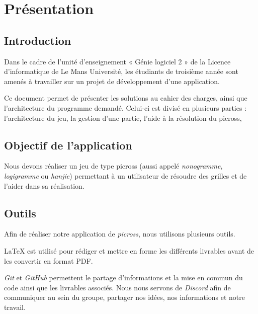 \documentclass{report}
\begin{document}
\renewcommand{\contentsname}{Sommaire}
\tableofcontents
\thispagestyle{empty}
\thispagestyle{plain}

\chapter{Présentation}
\thispagestyle{empty}
\thispagestyle{plain}

	\section{Introduction}

		Dans le cadre de l'unité d'enseignement « Génie logiciel 2 » de la Licence d'informatique de Le Mans Université, les étudiants de troisième année sont amenés à travailler sur un projet de développement d'une application.
		
		Ce document permet de présenter les solutions au cahier des charges, ainsi que l'architecture du programme demandé. Celui-ci est divisé en plusieurs parties : l'architecture du jeu, la gestion d'une partie, l'aide à la résolution du picross, %

	
 	\section{Objectif de l'application}		
		Nous devons réaliser un jeu de type picross (aussi appelé \textit{nonogramme}, \textit{logigramme} ou \textit{hanjie}) permettant à un utilisateur de résoudre des grilles et de l'aider dans sa réalisation.
		
	\section{Outils}
		
		Afin de réaliser notre application de \textit{picross}, nous utilisons plusieurs outils.
		
	LaTeX est utilisé pour rédiger et mettre en forme les différents livrables avant de les convertir en format PDF. 
	
    \textit{Git} et \textit{GitHub} permettent le partage d'informations et la mise en commun du code ainsi que les livrables associés. Nous nous servons de \textit{Discord} afin de communiquer au sein du groupe, partager nos idées, nos informations et notre travail.
\end{document}
